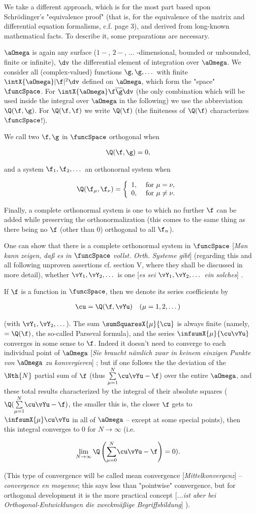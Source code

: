 \documentclass{article}
\newcommand{\WTF}[1]{
[\it{\small{#1}}]
}
\newcommand{\uequ}[1]{
\begin{align*}
#1
\end{align*}
}
\newcommand{\barred}[1]{
\overline{#1}
}
\renewcommand{\it}[1]{\textit{#1}}
\newcommand{\sumXY}[2]{\underset{#1}{\overset{#2}{\sum}}}
\begin{document}
We take a different approach, which is for the most part based upon Schrödinger's "equivalence proof" (that is, for the equivalence of the matrix and differential equation formalisms, c.f. page 3), and derived from long-known mathematical facts. To describe it, some preparations are necessary.

$\aOmega$ is again any surface ($1-$, $2-$, ... -dimensional, bounded or unbounded, finite or infinite), $\dv$ the differential element of integration over $\aOmega$. We consider all (complex-valued) functions $\g,\g,\dots$ with finite $\intX{\aOmega}|\f|^2\dv$ defined on $\aOmega$, which form the "space" $\funcSpace$. For $\intX{\aOmega}\f\barred{\g}\dv$ (the only combination which will be used inside the integral over $\aOmega$ in the following) we use the abbreviation $\Q(\f,\g)$. For $\Q(\f,\f)$ we write $\Q(\f)$ (the finiteness of $\Q(\f)$ characterizes $\funcSpace$!).

We call two $\f,\g$ in $\funcSpace$ orthogonal when
\uequ{
\Q(\f,\g)=0,
}
and a system $\f_1,\f_2,\dots$ an orthonornal system when
\uequ{
\Q(\f_\mu,\f_\nu) = \left\{
     \begin{array}{lr}
       1, & \text{ for } \mu = \nu, \\
       0, & \text{ for } \mu \neq \nu.
     \end{array}
   \right.
}
Finally, a complete orthonormal system is one to which no further $\f$ can be added while preserving the orthonormalization (this comes to the same thing as there being no $\f$ (other than 0) orthogonal to all $\f_n$).

One can show that there is a complete orthonormal system in $\funcSpace$\WTF{Man kann zeigen, daß es in $\funcSpace$ vollst. Orth. Systeme gibt} (regarding this and all following unproven assertions cf. section V, where they shall be discussed in more detail), whether $\vY_1,\vY_2,\dots$ is one\WTF{es sei $\vY_1,\vY_2,\dots$ ein solches}.

If $\f$ is a function in $\funcSpace$, then we denote its series coefficients by
\uequ{
\cu = \Q(\f, \vYu)\quad(\mu=1,2,\dots)
}
(with $\vY_1,\vY_2,\dots$). The sum $\sumSquaresX{\mu}{\cu}$ is always finite (namely, $=\Q(\f)$, the so-called Parseval formula), and the series $\infsumX{\mu}{\cu\vYu}$ converges in some sense to $\f$. Indeed it doesn't need to converge to each individual point of $\aOmega$\WTF{Sie braucht nämlich zwar in keinem einzigen Punkte von $\aOmega$ zu konvergieren}; but if one follows the the deviation of the $\Nth{N}$ partial sum of $\f$ (thus $\sumXY{\mu=1}{N}\cu\vYu - \f$) over the entire $\aOmega$, and these total results characterized by the integral of their absolute squares ($\Q(\sumXY{\mu=1}{N}\cu\vYu - \f)$, the smaller this is, the closer $\f$ gets to $\infsumX{\mu}\cu\vYu$ in all of $\aOmega$ -- except at some special points), then this integral converges to $0$ for $N\rightarrow\infty$ (i.e.
\uequ{
\lim_{N\to \infty} \Q\left(
\sumXY{\mu=0}{N}\cu\vYu - \f
\right) = 0).
}
(This type of convergence will be called mean convergence\WTF{Mittelkonvergenz} -- \it{convergence en moyenne}; this says less than "pointwise" convergence, but for orthogonal development it is the more practical concept\WTF{...ist aber bei Orthogonal-Entwicklungen die zweckmäßige Begriffsbildung}).
\end{document}
